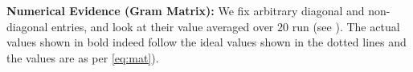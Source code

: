 \textbf{Numerical Evidence (Gram Matrix):} We fix arbitrary diagonal and non-diagonal entries, and look at their value averaged over $20$ run (see ). The actual values shown in bold indeed follow the ideal values shown in the dotted lines and the values are as per \eqref{eq:mat}). 


\begin{figure}[h]
\end{figure}
